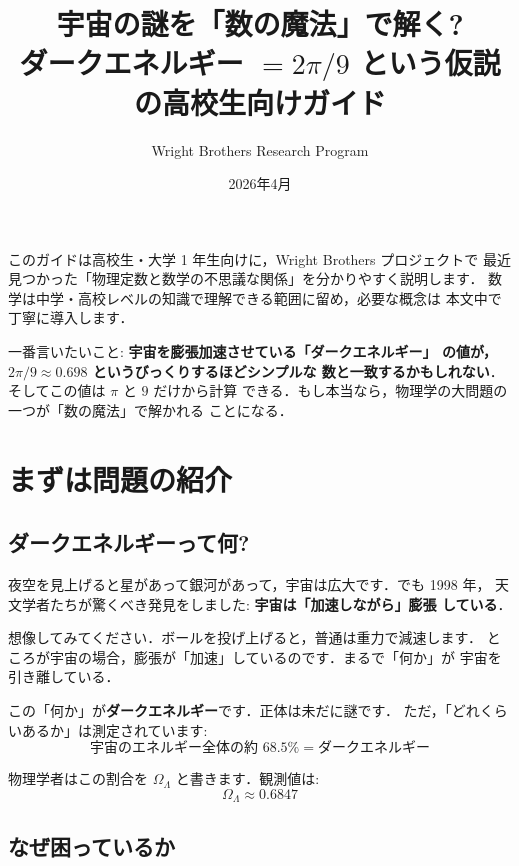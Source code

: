 \documentclass[11pt,a4paper]{article}
\title{宇宙の謎を「数の魔法」で解く?\\
\large ダークエネルギー $= 2\pi/9$ という仮説の高校生向けガイド}
\author{Wright Brothers Research Program}
\date{2026年4月}
\begin{document}
\maketitle

\begin{tcolorbox}[colback=yellow!5,colframe=orange!60!black,title=このガイドについて]
このガイドは高校生・大学 1 年生向けに，Wright Brothers プロジェクトで
最近見つかった「物理定数と数学の不思議な関係」を分かりやすく説明します．
数学は中学・高校レベルの知識で理解できる範囲に留め，必要な概念は
本文中で丁寧に導入します．

一番言いたいこと: \textbf{宇宙を膨張加速させている「ダークエネルギー」
の値が，$2\pi/9 \approx 0.698$ という\textbf{びっくりするほどシンプル}な
数と一致するかもしれない}．そしてこの値は $\pi$ と $9$ だけから計算
できる．もし本当なら，物理学の大問題の一つが「数の魔法」で解かれる
ことになる．
\end{tcolorbox}

\tableofcontents

\newpage
\section{まずは問題の紹介}

\subsection{ダークエネルギーって何?}

夜空を見上げると星があって銀河があって，宇宙は広大です．でも 1998 年，
天文学者たちが驚くべき発見をしました: \textbf{宇宙は「加速しながら」膨張
している}．

想像してみてください．ボールを投げ上げると，普通は重力で減速します．
ところが宇宙の場合，膨張が「加速」しているのです．まるで「何か」が
宇宙を引き離している．

この「何か」が\textbf{ダークエネルギー}です．正体は未だに謎です．
ただ，「どれくらいあるか」は測定されています:
\begin{equation*}
\text{宇宙のエネルギー全体の約 }68.5\% = \text{ダークエネルギー}
\end{equation*}

物理学者はこの割合を $\Omega_\Lambda$ と書きます．観測値は:
\begin{equation*}
\Omega_\Lambda \approx 0.6847
\end{equation*}

\subsection{なぜ困っているか}
\end{document}
